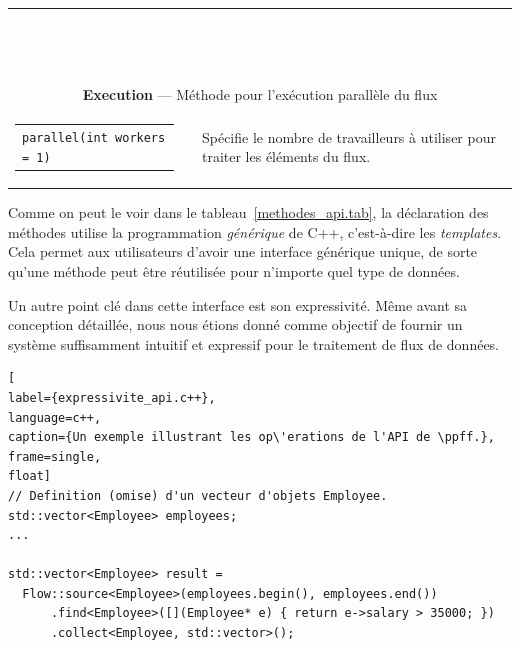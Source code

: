 \begin{center}
\begin{longtable}{|l|l|p{5cm}|}
    \\
\hline
    \multicolumn{3}{c}{\ }
\\
    \multicolumn{3}{c}{\ }
\\
    \multicolumn{3}{c}{\ }
\\
	\multicolumn{3}{|c|}{\textbf{Execution} --- M\'ethode pour l'ex\'ecution parall\`ele du flux\label{concurrent.page}}
    \\      
\hline
	\begin{tabular}{@{}l@{}}
	\tt parallel(int workers = 1)
	\end{tabular} &
	\TT{Flow\&} &
	Sp\'ecifie le nombre de travailleurs \`a utiliser pour traiter les \'el\'ements du flux.
    \\    
\hline    
\end{longtable}
\normalsize
\end{center}

\newpage
{}
\recalctypearea


Comme on peut le voir dans le tableau~\ref{methodes_api.tab}, la d\'eclaration des m\'ethodes utilise la programmation \emph{g\'en\'erique} de C++, c'est-\`a-dire les \emph{templates}. Cela permet aux utilisateurs d'avoir une interface g\'en\'erique unique, de sorte qu'une m\'ethode peut \^etre r\'eutilis\'ee pour n'importe quel type de donn\'ees.


Un autre point cl\'e dans cette interface est son expressivit\'e. M\^eme avant sa conception d\'etaill\'ee, nous nous \'etions donn\'e comme objectif de fournir un syst\`eme suffisamment intuitif et expressif pour le traitement de flux de donn\'ees.


\begin{lstlisting}[
label={expressivite_api.c++},
language=c++,
caption={Un exemple illustrant les op\'erations de l'API de \ppff.},
frame=single,
float]
// Definition (omise) d'un vecteur d'objets Employee.
std::vector<Employee> employees;
...

std::vector<Employee> result = 
  Flow::source<Employee>(employees.begin(), employees.end())
      .find<Employee>([](Employee* e) { return e->salary > 35000; })
      .collect<Employee, std::vector>();
\end{lstlisting}


